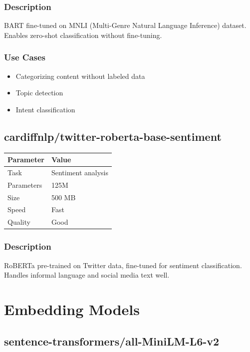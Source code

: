 \documentclass[12pt,a4paper]{report}
\begin{document}
\subsubsection{Description}

BART fine-tuned on MNLI (Multi-Genre Natural Language Inference) dataset. Enables zero-shot classification without fine-tuning.

\subsubsection{Use Cases}

\begin{itemize}
    \item Categorizing content without labeled data
    \item Topic detection
    \item Intent classification
\end{itemize}

\subsection{cardiffnlp/twitter-roberta-base-sentiment}

\begin{tabular}{|p{3cm}|p{11cm}|}
\hline
\textbf{Parameter} & \textbf{Value} \\
\hline
Task & Sentiment analysis \\
\hline
Parameters & 125M \\
\hline
Size & 500 MB \\
\hline
Speed & Fast \\
\hline
Quality & Good \\
\hline
\end{tabular}

\subsubsection{Description}

RoBERTa pre-trained on Twitter data, fine-tuned for sentiment classification. Handles informal language and social media text well.

\section{Embedding Models}

\subsection{sentence-transformers/all-MiniLM-L6-v2}
\end{document}

